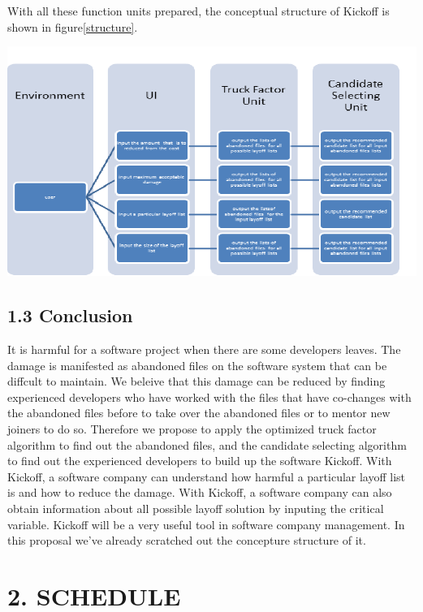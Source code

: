 \documentclass[11pt, a4paper, openright]{report}
\begin{document}
With all these function units prepared, the conceptual structure of Kickoff is shown in figure\ref{structure}.
\begin{center}
	\includegraphics[scale=0.8]{structure}
	\label{structure}
\end{center}

\subsection*{1.3 Conclusion}
It is harmful for a software project when there are some developers leaves. The damage is manifested as abandoned
files on the software system that can be diffcult to maintain.
We beleive that this damage can be reduced by finding experienced developers who have worked with the files that have co-changes with the abandoned files before to take over the abandoned files or to mentor new joiners to do so. Therefore we propose to apply the optimized truck factor algorithm to find out the abandoned files, and the candidate selecting algorithm to find out the experienced developers to build up the software Kickoff. With Kickoff, a software company can understand how harmful a particular layoff list is and how to reduce the damage. With Kickoff, a software company can also obtain information about all possible layoff solution by inputing the critical variable. Kickoff will be a very useful tool in software company management. In this proposal we've already scratched out the concepture structure of it.

\section* {2. SCHEDULE}
\end{document}
